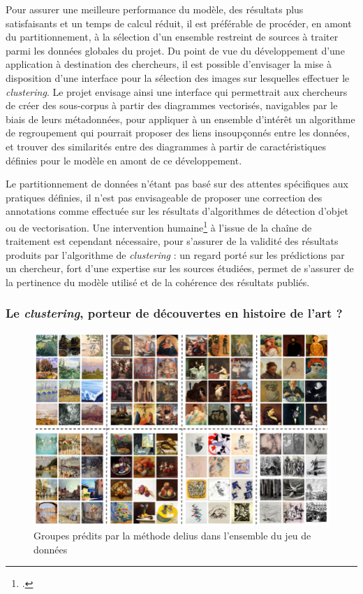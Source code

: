     Pour assurer une meilleure performance du modèle, des résultats plus satisfaisants et un temps de calcul réduit, il est préférable de procéder, en amont du partitionnement, à la sélection d'un ensemble restreint de sources à traiter parmi les données globales du projet. Du point de vue du développement d'une application à destination des chercheurs, il est possible d'envisager la mise à disposition d'une interface pour la sélection des images sur lesquelles effectuer le \textit{clustering}. Le projet \eida envisage ainsi une interface qui permettrait aux chercheurs de créer des sous-corpus à partir des diagrammes vectorisés, navigables par le biais de leurs métadonnées, pour appliquer à un ensemble d'intérêt un algorithme de regroupement qui pourrait proposer des liens insoupçonnés entre les données, et trouver des similarités entre des diagrammes à partir de caractéristiques définies pour le modèle en amont de ce développement.
    
    Le partitionnement de données n'étant pas basé sur des attentes spécifiques aux pratiques définies, il n'est pas envisageable de proposer une correction des annotations comme effectuée sur les résultats d'algorithmes de détection d'objet ou de vectorisation. Une intervention humaine\footcite{deluaSupervisedVsUnsupervised2021} à l'issue de la chaîne de traitement est cependant nécessaire, pour s'assurer de la validité des résultats produits par l'algorithme de \textit{clustering} : un regard porté sur les prédictions par un chercheur, fort d'une expertise sur les sources étudiées, permet de s'assurer de la pertinence du modèle utilisé et de la cohérence des résultats publiés.
    
    \subsubsection{Le \textit{clustering}, porteur de découvertes en histoire de l'art ?}
    \begin{figure}[h]
    	\centering
    	\includegraphics[width=15cm]{images/delius_global_clusters.png}
    	\caption{Groupes prédits par la méthode \acrshort{delius} dans l'ensemble du jeu de données}
    	\label{fig:delius_global_clusters}
    \end{figure}

